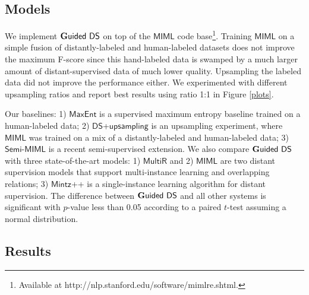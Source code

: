 \documentclass[11pt]{article}
\begin{document}
\subsection{Models}


We implement $\mathsf{{\bf G}uided\ DS}$ on top of the $\mathsf{MIML}$ \cite{surdeanu12} 
code base\footnote{Available at http://nlp.stanford.edu/software/mimlre.shtml.}. 
Training $\mathsf{MIML}$ on a simple fusion of distantly-labeled and human-labeled datasets does not improve the maximum F-score since
this hand-labeled data is swamped by a much larger amount of distant-supervised data of much lower quality. Upsampling the labeled data did not improve the performance either.
We experimented with different upsampling ratios and report best results using ratio 1:1 in Figure \ref{plots}.

Our baselines: %
1) $\mathsf{MaxEnt}$ is a supervised maximum entropy baseline trained on a human-labeled data;
2) $\mathsf{DS}$+$\mathsf{upsampling}$ is an upsampling experiment, where $\mathsf{MIML}$ was trained on a 
mix of a distantly-labeled and human-labeled data; 
3) $\mathsf{Semi}$-$\mathsf{MIML}$ is a recent semi-supervised extension.
We also compare $\mathsf{{\bf G}uided\ DS}$ with three state-of-the-art models:
1) $\mathsf{MultiR}$ and 2) $\mathsf{MIML}$ are two distant supervision models that support multi-instance learning
and overlapping relations;
3) $\mathsf{Mintz}$++ is a single-instance learning algorithm for distant supervision.
The difference between $\mathsf{{\bf G}uided\ DS}$ and all other systems is significant 
with $p$-value less than 0.05 according to a paired $t$-test assuming a normal distribution.

\subsection{Results}
\end{document}

